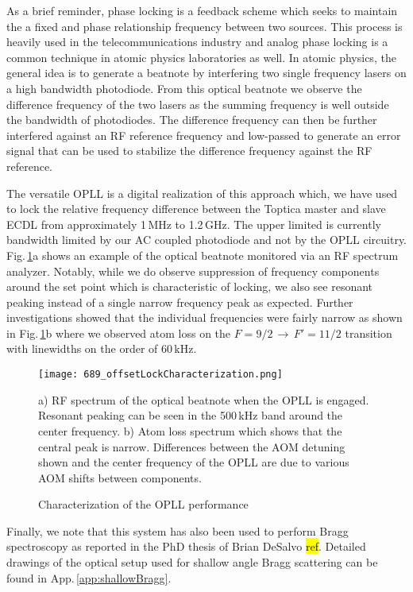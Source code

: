 As a brief reminder, phase locking is a feedback scheme which seeks to maintain the a fixed and phase relationship frequency between two sources.
This process is heavily used in the telecommunications industry and analog phase locking is a common technique in atomic physics laboratories as well.
In atomic physics, the general idea is to generate a beatnote by interfering two single frequency lasers on a high bandwidth photodiode.
From this optical beatnote we observe the difference frequency of the two lasers as the summing frequency is well outside the bandwidth of photodiodes.
The difference frequency can then be further interfered against an RF reference frequency and low-passed to generate an error signal that can be used to stabilize the difference frequency against the RF reference.

The versatile OPLL is a digital realization of this approach which, we have used to lock the relative frequency difference between the Toptica master and slave ECDL from approximately 1\,MHz to 1.2\,GHz.
The upper limited is currently bandwidth limited by our AC coupled photodiode and not by the OPLL circuitry.
Fig.\,\ref{fig:offsetDetails}a shows an example of the optical beatnote monitored via an RF spectrum analyzer.
Notably, while we do observe suppression of frequency components around the set point which is characteristic of locking, we also see resonant peaking instead of a single narrow frequency peak as expected.
Further investigations showed that the individual frequencies were fairly narrow as shown in Fig.\,\ref{fig:offsetDetails}b where we observed atom loss on the $F=9/2\,\rightarrow\,F'=11/2$ transition with linewidths on the order of 60\,kHz.
	\begin{figure}
	\centerline{
		\texttt{[image: 689\_offsetLockCharacterization.png]}}
		\caption{Characterization of the OPLL performance}{a) RF spectrum of the optical beatnote when the OPLL is engaged. Resonant peaking can be seen in the 500\,kHz band around the center frequency. b) Atom loss spectrum which shows that the central peak is narrow. Differences between the AOM detuning shown and the center frequency of the OPLL are due to various AOM shifts between components.}
		 \label{fig:offsetDetails}
	\end{figure}

Finally, we note that this system has also been used to perform Bragg spectroscopy as reported in the PhD thesis of Brian DeSalvo \hl{ref}.
Detailed drawings of the optical setup used for shallow angle Bragg scattering can be found in App.\,\ref{app:shallowBragg}.


